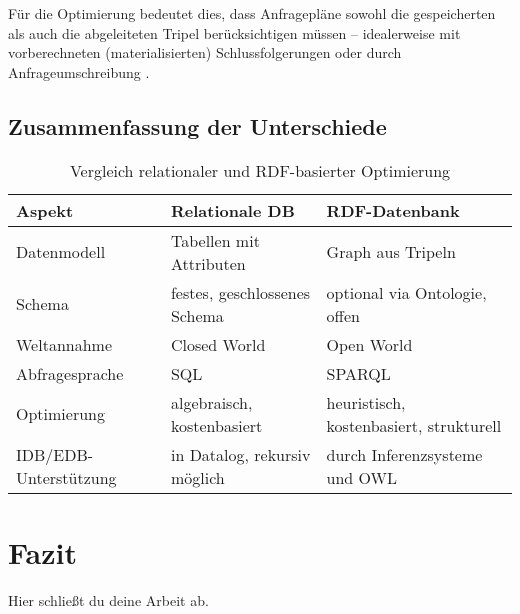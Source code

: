 \documentclass[12pt]{article}
\begin{document}
Für die Optimierung bedeutet dies, dass Anfragepläne sowohl die gespeicherten als auch die abgeleiteten Tripel berücksichtigen müssen – idealerweise mit vorberechneten (materialisierten) Schlussfolgerungen oder durch Anfrageumschreibung \cite{motik2007sparql}.

\subsection{Zusammenfassung der Unterschiede}

\vspace{0.5em}
\begin{table}[h]
\centering
\caption{Vergleich relationaler und RDF-basierter Optimierung}
\begin{tabular}{|p{4.5cm}|p{5cm}|p{5cm}|}
\hline
\textbf{Aspekt} & \textbf{Relationale DB} & \textbf{RDF-Datenbank} \\
\hline
Datenmodell & Tabellen mit Attributen & Graph aus Tripeln \\
Schema & festes, geschlossenes Schema & optional via Ontologie, offen \\
Weltannahme & Closed World & Open World \\
Abfragesprache & SQL & SPARQL \\
Optimierung & algebraisch, kostenbasiert & heuristisch, kostenbasiert, strukturell \\
IDB/EDB-Unterstützung & in Datalog, rekursiv möglich & durch Inferenzsysteme und OWL \\
\hline
\end{tabular}
\end{table}


\section{Fazit}
Hier schließt du deine Arbeit ab.

\printbibliography
\end{document}
